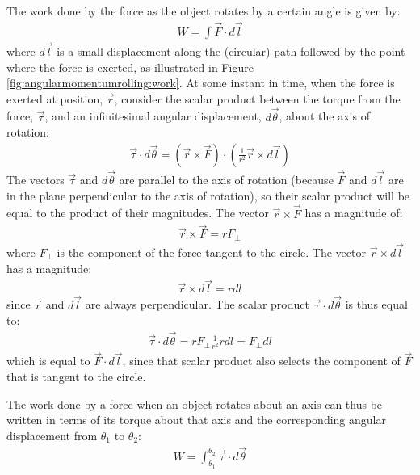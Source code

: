 The work done by the force as the object rotates by a certain angle is given by:
\begin{align*}
W = \int \vec F \cdot d\vec l
\end{align*}
where $d\vec l$ is a small displacement along the (circular) path followed by the point where the force is exerted, as illustrated in Figure \ref{fig:angularmomentumrolling:work}.
At some instant in time, when the force is exerted at position, $\vec r$, consider the scalar product between the torque from the force, $\vec \tau$, and an infinitesimal angular displacement, $d\vec \theta$, about the axis of rotation:
\begin{align*}
\vec\tau \cdot d\vec\theta = (\vec r \times \vec F) \cdot \left(\frac{1}{r^2} \vec r\times d\vec l\right)
\end{align*}
The vectors $\vec \tau$ and $d\vec \theta$ are parallel to the axis of rotation (because $\vec F$ and $d\vec l$ are in the plane perpendicular to the axis of rotation), so their scalar product will be equal to the product of their magnitudes. The vector $\vec r \times \vec F$ has a magnitude of:
\begin{align*}
\vec r \times \vec F = rF_\perp
\end{align*} 
where $F_\perp$ is the component of the force tangent to the circle. The vector $\vec r\times d\vec l$ has a magnitude:
\begin{align*}
\vec r\times d\vec l = rdl
\end{align*}
since $\vec r$ and $d\vec l$ are always perpendicular. The scalar product $\vec\tau \cdot d\vec\theta$ is thus equal to:
\begin{align*}
\vec\tau \cdot d\vec\theta = rF_\perp \frac{1}{r^2} rdl = F_\perp dl
\end{align*}
which is equal to $\vec F \cdot d\vec l$, since that scalar product also selects the component of $\vec F$ that is tangent to the circle. 

The work done by a force when an object rotates about an axis can thus be written in terms of its torque about that axis and the corresponding angular displacement from $\theta_1$ to $\theta_2$:
\begin{align}
W = \int_{\theta_1}^{\theta_2}\vec\tau\cdot d\vec \theta
\end{align}

